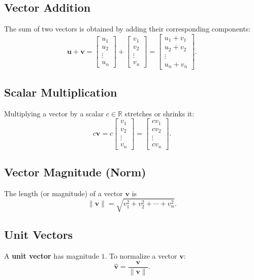 \documentclass[a4paper,12pt]{article}
\begin{document}
\subsection{Vector Addition}
The sum of two vectors is obtained by adding their corresponding components:
\[
\mathbf{u} + \mathbf{v} = \begin{bmatrix} u_1 \\ u_2 \\ \vdots \\ u_n \end{bmatrix}
+ \begin{bmatrix} v_1 \\ v_2 \\ \vdots \\ v_n \end{bmatrix}
= \begin{bmatrix} u_1 + v_1 \\ u_2 + v_2 \\ \vdots \\ u_n + v_n \end{bmatrix}.
\]

\subsection{Scalar Multiplication}
Multiplying a vector by a scalar $c \in \mathbb{R}$ stretches or shrinks it:
\[
c\mathbf{v} = c \begin{bmatrix} v_1 \\ v_2 \\ \vdots \\ v_n \end{bmatrix}
= \begin{bmatrix} cv_1 \\ cv_2 \\ \vdots \\ cv_n \end{bmatrix}.
\]

\subsection{Vector Magnitude (Norm)}
The length (or magnitude) of a vector $\mathbf{v}$ is
\[
\|\mathbf{v}\| = \sqrt{v_1^2 + v_2^2 + \cdots + v_n^2}.
\]

\subsection{Unit Vectors}
A \textbf{unit vector} has magnitude $1$. To normalize a vector $\mathbf{v}$:
\[
\hat{\mathbf{v}} = \frac{\mathbf{v}}{\|\mathbf{v}\|}.
\]
\end{document}

